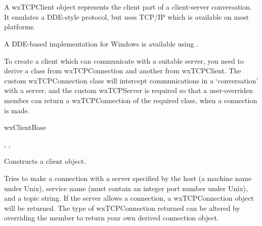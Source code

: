 \section{}\label{wxtcpclient}

A wxTCPClient object represents the client part of a client-server conversation.
It emulates a DDE-style protocol, but uses TCP/IP which is available on most platforms.

A DDE-based implementation for Windows is available using .

To create a client which can communicate with a suitable server,
you need to derive a class from wxTCPConnection and another from wxTCPClient.
The custom wxTCPConnection class will intercept communications in
a `conversation' with a server, and the custom wxTCPServer is required
so that a user-overriden  member can return
a wxTCPConnection of the required class, when a connection is made.


wxClientBase\\


, , 




Constructs a client object.

\label{wxtcpclientmakeconnection}


Tries to make a connection with a server specified by the host
(a machine name under Unix), service name (must
contain an integer port number under Unix), and a topic string. If the
server allows a connection, a wxTCPConnection object will be returned.
The type of wxTCPConnection returned can be altered by overriding
the  member to return your own
derived connection object.

